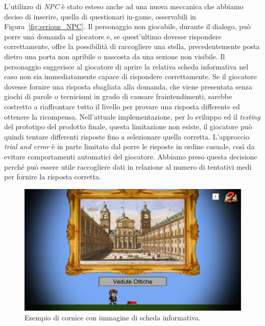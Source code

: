 L’utilizzo di \textit{NPC} è stato esteso anche ad una nuova meccanica che abbiamo deciso di inserire, quella di questionari in-game, osservabili in Figura~\ref{fig:serious_NPC}.
Il personaggio non giocabile, durante il dialogo, può porre una domanda al giocatore e, se quest’ultimo dovesse rispondere correttamente, offre la possibilità di raccogliere una stella, precedentemente posta dietro una porta non apribile o nascosta da una sezione non visibile.
Il personaggio suggerisce al giocatore di aprire la relativa scheda informativa nel caso non sia immediatamente capace di rispondere correttamente.
Se il giocatore dovesse fornire una risposta sbagliata alla domanda, che viene presentata senza giochi di parole o tecnicismi in grado di causare fraintendimenti, sarebbe costretto a riaffrontare tutto il livello per provare una risposta differente ed ottenere la ricompensa.
Nell’attuale implementazione, per lo sviluppo ed il \textit{testing} del prototipo del prodotto finale, questa limitazione non esiste, il giocatore può quindi tentare differenti risposte fino a selezionare quella corretta. L’approccio \textit{trial and error} è in parte limitato dal porre le risposte in ordine casuale, così da evitare comportamenti automatici del giocatore.
Abbiamo preso questa decisione perché può essere utile raccogliere dati in relazione al numero di tentativi medi per fornire la risposta corretta.

\begin{figure}%
	\centering
	\includegraphics[width= 0.9\columnwidth]{images/gameDesign/54_corniciona.jpg}
	\caption{Esempio di cornice con immagine di scheda informativa.}
	\label{fig:serious_corniciona}
\end{figure}

